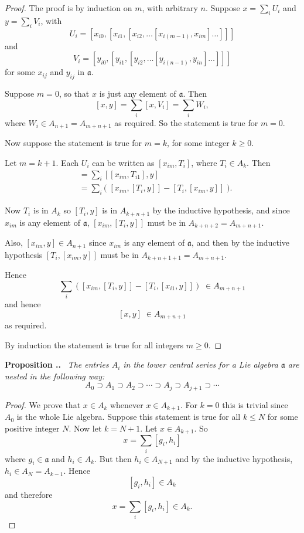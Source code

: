 \documentclass[honours]{UNSWthesis}
\newcommand{\1}{\mathbf{e}_{1}}
\newcommand{\2}{\mathbf{e}_{3}}
\newcommand{\3}{\mathbf{e}_{3}}
\newcounter{Item}[section]
\newenvironment{Proposition}{\medskip
                            \refstepcounter{Item}
                            \noindent
                           {\bf Proposition \thesection.\theItem.}\ %
                            \begingroup \sl}
                           {\endgroup\medskip}
\begin{document}
\begin{proof}
The proof is by induction on $m$, with arbitrary $n$. Suppose $x=\sum\limits_{i} U_{i}$ and $y=\sum\limits_{i} V_{i}$, with 
\[
U_{i}=[x_{i0},[x_{i1},[x_{i2},\ldots [x_{i(m-1)},x_{im}]\ldots]]]
\]
and 
\[
V_{i}=[y_{i0},[y_{i1},[y_{i2},\ldots [y_{i(n-1)},y_{in}]\ldots]]]
\]
for some $x_{ij}$ and $y_{ij}$ in $\mathfrak{a}$.

Suppose $m=0$, so that $x$ is just any element of $\mathfrak{a}$. Then 
\[
[x,y]=\sum\limits_{i}[x,V_{i}]=\sum\limits_{i}W_{i},
\]
where $W_{i} \in A_{n+1}=A_{m+n+1}$ as required. So the statement is true for $m=0$. 

Now suppose the statement is true for $m = k$, for some integer $k \geq 0$. 

Let $m=k+1$. Each $U_{i}$ can be written as $[x_{im},T_{i}]$, where $T_{i} \in A_{k}$. Then
\begin{align*}
[x,y] &=\sum\limits_{i}[[x_{im},T_{i1}],y] \\
&= \sum\limits_{i}\big( \; [x_{im},[T_{i},y]]-[T_{i},[x_{im},y]]\; \big).
\end{align*}

Now $T_{i}$ is in $A_{k}$ so $[T_{i},y]$ is in $A_{k+n+1}$ by the inductive hypothesis, and since $x_{im}$ is any element of $\mathfrak{a}$, $[x_{im},[T_{i},y]]$ must be in $A_{k+n+2}=A_{m+n+1}$. 

Also, $[x_{im},y] \in A_{n+1}$ since $x_{im}$ is any element of $\mathfrak{a}$, and then by the inductive hypothesis $[T_{i},[x_{im},y]]$ must be in $A_{k+n+1+1}=A_{m+n+1}$. 

Hence 
$$\sum\limits_{i}([x_{im},[T_{i},y]]-[T_{i},[x_{i1},y]])\;\in A_{m+n+1}$$
and hence
$$[x,y] \;\in A_{m+n+1} $$
as required. 

By induction the statement is true for all integers $m \geq 0$.
\end{proof}

\begin{Proposition}
The entries $A_{i}$ in the lower central series for a Lie algebra $\mathfrak{a}$ are nested in the following way:
\[
A_{0}\supset A_{1} \supset A_{2} \supset \cdots \supset A_{j} \supset A_{j+1} \supset \cdots
\]
\end{Proposition}
 
\begin{proof}
We prove that $x \in A_{k}$ whenever $x \in A_{k+1}$. For $k=0$ this is trivial since $A_{0}$ is the whole Lie algebra. Suppose this statement is true for all $k \leq N$ for some positive integer $N$. Now let $k=N+1$.
Let $x \in A_{k+1}$. So 
\[
x= \sum\limits_{i}[g_{i},h_{i}]
\]
where $g_{i} \in \mathfrak{a}$ and $h_{i} \in A_{k}$. But then $h_{i} \in A_{N+1}$ and by the inductive hypothesis, $h_{i} \in A_{N}=A_{k-1}$. Hence 
\[
[g_{i},h_{i}] \in A_{k}
\]
and therefore
\[
x=\sum\limits_{i}[g_{i},h_{i}] \in A_{k}.
\]
\end{proof}
\end{document}
